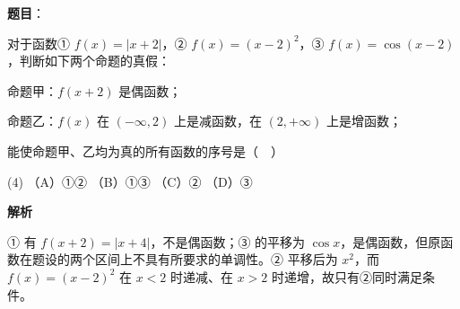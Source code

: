 \begin{answer}

\textbf{题目}：

对于函数① $f(x)=|x+2|$，② $f(x)=(x-2)^2$，③ $f(x)=\cos(x-2)$，判断如下两个命题的真假：

命题甲：$f(x+2)$ 是偶函数；

命题乙：$f(x)$ 在 $(-\infty,2)$ 上是减函数，在 $(2,+\infty)$ 上是增函数；

能使命题甲、乙均为真的所有函数的序号是（　）

\begin{gkopts}(4)
\task （A）①②
\task （B）①③
\task （C）②
\task （D）③
\end{gkopts}

\textbf{解析}

① 有 $f(x+2)=|x+4|$，不是偶函数；③ 的平移为 $\cos x$，是偶函数，但原函数在题设的两个区间上不具有所要求的单调性。② 平移后为 $x^2$，而 $f(x)=(x-2)^2$ 在 $x<2$ 时递减、在 $x>2$ 时递增，故只有②同时满足条件。


\end{answer}

